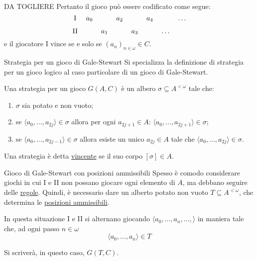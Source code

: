 \documentclass[babel]{beamer}
\renewcommand{\href}[2]{#2}
\begin{document}
\begin{frame}[label={sec:org922f952}]{DA TOGLIERE}
Pertanto il gioco può essere codificato come segue:
\begin{equation*}
\begin{tikzcd}[ampersand replacement=\&,cramped,sep=tiny]
	{\text{I}} \& {a_0} \&\& {a_2} \&\& {a_4} \&\& \dots \\
	{\text{II}} \&\& {a_1} \&\& {a_3} \&\& \dots
\end{tikzcd}
\end{equation*}
e il giocatore I vince se e solo se \((a_{n})_{n \in \omega} \in C\).
\end{frame}
\begin{frame}[label={sec:orge77dc7e}]{Strategia per un gioco di Gale-Stewart}
Si specializza la definizione di \href{../../../../../../../org/roam/20250513155732-logic_game.org}{strategia per un gioco logico} al caso particolare di un gioco di Gale-Stewart.

Una strategia per un gioco \(G(A,C)\) è un \href{../../../../../../../org/roam/20250514142154-albero_teoria_descrittiva_degli_insiemi.org}{albero} \(\sigma \subseteq A^{<\omega}\) tale che:
\begin{enumerate}
\item \(\sigma\) sia \href{../../../../../../../org/roam/20250514142208-albero_potato.org}{potato} e non vuoto;

\item se \(\langle a_{0},\dots,a_{2j}\rangle \in \sigma\) allora per ogni \(a_{2j+1} \in A\): \(\langle a_{0},\dots,a_{2j+1}\rangle \in \sigma\);

\item se \(\langle a_{0},\dots,a_{2j-1}\rangle \in \sigma\) allora esiste un unico \(a_{2j} \in A\) tale che \(\langle a_{0},\dots,a_{2j}\rangle \in \sigma\).
\end{enumerate}

Una strategia è detta \uline{vincente} se il suo \href{../../../../../../../org/roam/20250514142251-corpo_di_un_albero.org}{corpo} \([\sigma] \in A\).
\end{frame}
\begin{frame}[label={sec:orgcb9539c}]{Gioco di Gale-Stewart con posizioni ammissibili}
Spesso è comodo considerare giochi in cui I e II non possano giocare ogni elemento di \(A\), ma debbano seguire delle \uline{regole}. Quindi, è necessario dare un alberto potato non vuoto \(T \subseteq A^{<\omega}\), che determina le \href{../../../../../../../org/roam/20250514142938-posizioni_ammissibili_in_un_gioco_logico.org}{\uline{posizioni ammissibili}}.

In questa situazione I e II si alternano giocando \(\langle a_{0},\dots,a_{n},\dots,\rangle\) in maniera tale che, ad ogni passo \(n \in \omega\)
\begin{equation*}
\langle a_{0},\dots,a_{n}\rangle \in T
\end{equation*}

Si scriverà, in questo caso, \(G(T, C)\).
\end{frame}
\end{document}

